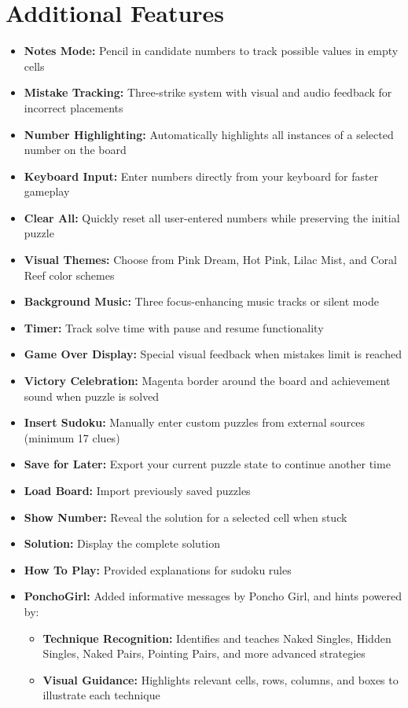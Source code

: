 \documentclass[12pt,a4paper]{article}
\begin{document}
\section{Additional Features}
\begin{itemize}
    \item \textbf{Notes Mode:} Pencil in candidate numbers to track possible values in empty cells
    \item \textbf{Mistake Tracking:} Three-strike system with visual and audio feedback for incorrect placements
    \item \textbf{Number Highlighting:} Automatically highlights all instances of a selected number on the board
    \item \textbf{Keyboard Input:} Enter numbers directly from your keyboard for faster gameplay
    \item \textbf{Clear All:} Quickly reset all user-entered numbers while preserving the initial puzzle
    \item \textbf{Visual Themes:} Choose from Pink Dream, Hot Pink, Lilac Mist, and Coral Reef color schemes
    \item \textbf{Background Music:} Three focus-enhancing music tracks or silent mode
    \item \textbf{Timer:} Track solve time with pause and resume functionality
    \item \textbf{Game Over Display:} Special visual feedback when mistakes limit is reached
    \item \textbf{Victory Celebration:} Magenta border around the board and achievement sound when puzzle is solved
    \item \textbf{Insert Sudoku:} Manually enter custom puzzles from external sources (minimum 17 clues)
    \item \textbf{Save for Later:} Export your current puzzle state to continue another time
    \item \textbf{Load Board:} Import previously saved puzzles
    \item \textbf{Show Number:} Reveal the solution for a selected cell when stuck
    \item \textbf{Solution:} Display the complete solution
    \item \textbf{How To Play:} Provided explanations for sudoku rules
    \item \textbf{PonchoGirl:} Added informative messages by Poncho Girl, and hints powered by:
    \begin{itemize}[label=$\circ$]
        \item \textbf{Technique Recognition:} Identifies and teaches Naked Singles, Hidden Singles, Naked Pairs, Pointing Pairs, and more advanced strategies
        \item \textbf{Visual Guidance:} Highlights relevant cells, rows, columns, and boxes to illustrate each technique
    \end{itemize}
\end{itemize}
\end{document}
